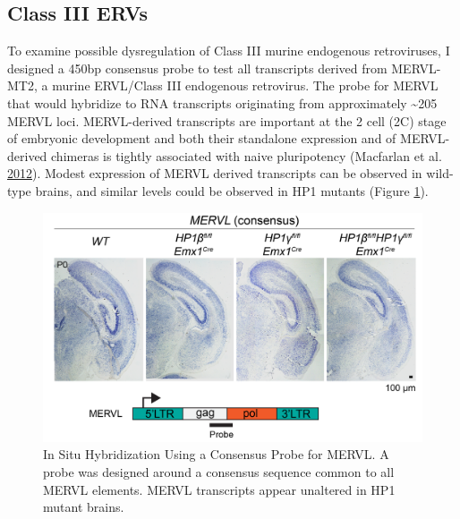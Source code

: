 \documentclass[onehalf,12pt]{beavtex}
\begin{document}
  \FloatBarrier
  
  \subsection{Class III ERVs}\label{class-iii-ervs}
  
  To examine possible dysregulation of Class III murine endogenous
  retroviruses, I designed a 450bp consensus probe to test all transcripts
  derived from MERVL-MT2, a murine ERVL/Class III endogenous retrovirus.
  The probe for MERVL that would hybridize to RNA transcripts originating
  from approximately \textasciitilde{}205 MERVL loci. MERVL-derived
  transcripts are important at the 2 cell (2C) stage of embryonic
  development and both their standalone expression and of MERVL-derived
  chimeras is tightly associated with naive pluripotency (Macfarlan et al.
  \protect\hyperlink{ref-MacfarlanEmbryonicstemcell2012}{2012}). Modest
  expression of MERVL derived transcripts can be observed in wild-type
  brains, and similar levels could be observed in HP1 mutants (Figure
  \ref{fig:MERVLish}).
  
  \begin{figure}
  
  {\centering \includegraphics[width=1\linewidth, ]{./figure/results/MERVL} 
  
  }
  
  \caption[In Situ Hybridization Using a Consensus Probe for MERVL]{In Situ Hybridization Using a Consensus Probe for MERVL.  A probe was designed around a consensus sequence common to all MERVL elements.  MERVL transcripts appear unaltered in HP1 mutant brains.}\label{fig:MERVLish}
  \end{figure}
  
  \FloatBarrier
  
\end{document}
